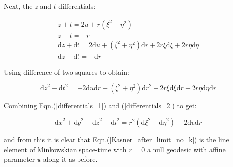 \noindent Next, the $z$ and $t$ differentials:

\begin{eqnarray*}
z + t = 2 u + r (\xi^2 + \eta^2) \\
z - t = - r \\
{\mathrm{d}z} + {\mathrm{d}t} = 2 \mathrm{d}u + (\xi^2 + \eta^2) \mathrm{d}r + 2 r \xi {\mathrm{d}\xi} + 2 r \eta {\mathrm{d}\eta} \\
{\mathrm{d}z} - {\mathrm{d}t} = - \mathrm{d}r 
\end{eqnarray*}

\noindent Using difference of two squares to obtain:

\begin{equation}\label{differentials_2}
{\mathrm{d}z}^2 - {\mathrm{d}t}^2 = -2 {\mathrm{d}u}{\mathrm{d}r} - (\xi^2 + \eta^2) {\mathrm{d}r}^2 - 2 r \xi {\mathrm{d}\xi}{\mathrm{d}r} - 2 r \eta {\mathrm{d}\eta}{\mathrm{d}r}
\end{equation}

\noindent Combining Eqn.(\ref{differentials_1}) and (\ref{differentials_2}) to get:

\begin{equation*}
{\mathrm{d}x}^2 + {\mathrm{d}y}^2 + {\mathrm{d}z}^2 - {\mathrm{d}t}^2 = r^2 ({\mathrm{d}\xi}^2 + {\mathrm{d}\eta}^2) - 2 {\mathrm{d}u}{\mathrm{d}r}
\end{equation*}

\noindent and from this it is clear that Eqn.(\ref{Kasner_after_limit_no_k}) is the line element of Minkowskian space-time with $r = 0$ a null geodesic with affine parameter $u$ along it as before. 
